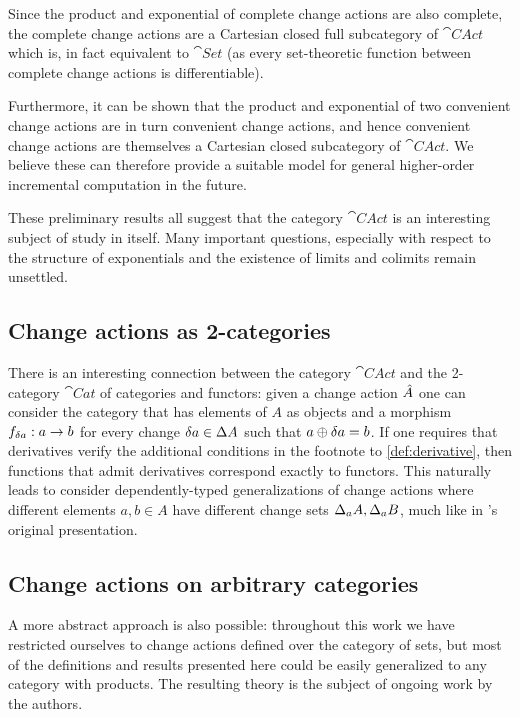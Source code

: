 Since the product and exponential of complete change actions are also complete,  the complete change
actions are a Cartesian closed full subcategory of $\cat{CAct}$ which is, in fact equivalent
to $\cat{Set}$ (as every set-theoretic function between complete change actions is differentiable).

Furthermore, it can be shown that the product and exponential of two convenient
change actions are in turn convenient change actions, and hence convenient
change actions are themselves a Cartesian closed subcategory of $\cat{CAct}$. We
believe these can therefore provide a suitable model for general higher-order
incremental computation in the future.

These preliminary results all suggest that the category $\cat{CAct}$ is an
interesting subject of study in itself. Many important questions, especially
with respect to the structure of exponentials and the existence of limits and
colimits remain unsettled.

\subsection{Change actions as 2-categories}

There is an interesting connection between the category $\cat{CAct}$ and the 2-category 
$\cat{Cat}$ of categories and functors: given a change action $\hat{A}$ one can consider
the category that has elements of $A$ as objects and a morphism $f_{\delta a} : a \rightarrow b$ for
every change $\delta a \in \Delta A$ such that $a \oplus \delta a = b$. If one requires
that derivatives verify the additional conditions in the footnote to \cref{def:derivative}, then functions that
admit derivatives correspond exactly to functors. This naturally leads to consider dependently-typed
generalizations of change actions where different elements $a, b \in A$ have different change
sets $\Delta _aA, \Delta _aB$, much like in \citeauthor{cai2014changes}'s original presentation.

\subsection{Change actions on arbitrary categories}

A more abstract approach is also possible: throughout this work we have restricted ourselves
to change actions defined over the category of sets, but most of the definitions and results
presented here could be easily generalized to any category with products. The resulting theory
is the subject of ongoing work by the authors.

